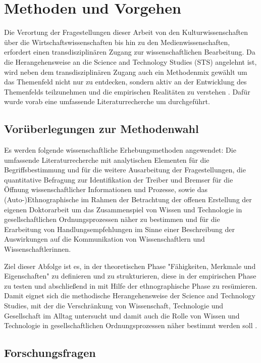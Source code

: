 \chapter{Methoden und Vorgehen}

Die Verortung der Fragestellungen dieser Arbeit von den Kulturwissenschaften über die Wirtschaftswissenschaften bis hin zu den Medienwissenschaften, erfordert einen transdisziplinären Zugang zur wissenschaftlichen Bearbeitung. Da die Herangehensweise an die Science and Technology Studies (STS) angelehnt ist, wird neben dem transdisziplinären Zugang auch ein Methodenmix gewählt um das Themenfeld nicht nur zu entdecken, sondern aktiv an der Entwicklung des Themenfelds teilzunehmen \cite{MacKenzie_STS_1999} und die empirischen Realitäten zu verstehen \cite{kelty_2014_freedom}. Dafür wurde vorab eine umfassende Literaturrecherche um durchgeführt.

\section{Vorüberlegungen zur Methodenwahl}

Es werden folgende wissenschaftliche Erhebungsmethoden angewendet: Die umfassende Literaturrecherche mit analytischen Elementen für die Begriffsbestimmung und für die weitere Ausarbeitung der Fragestellungen, die quantitative Befragung zur Identifikation der Treiber und Bremser für die Öffnung wissenschaftlicher Informationen und Prozesse, sowie das (Auto-)Ethnographische im Rahmen der Betrachtung der offenen Erstellung der eigenen Doktorarbeit um das Zusammenspiel von Wissen und Technologie in gesellschaftlichen Ordnungsprozessen näher zu bestimmen und für die Erarbeitung von Handlungsempfehlungen im Sinne einer Beschreibung der Auswirkungen auf die Kommunikation von Wissenschaftlern und Wissenschaftlerinnen.

Ziel dieser Abfolge ist es, in der theoretischen Phase "Fähigkeiten, Merkmale und Eigenschaften" \cite{raab_2012_fragebogen} zu definieren und zu strukturieren, diese in der empirischen Phase zu testen und abschließend in mit Hilfe der ethnographische Phase zu resümieren. Damit eignet sich die methodische Herangehensweise der Science and Technology Studies, mit der die Verschränkung von Wissenschaft, Technologie und Gesellschaft im Alltag untersucht und damit auch die Rolle von Wissen und Technologie in gesellschaftlichen Ordnungsprozessen näher bestimmt werden soll \cite{beck_2014_science}.

\section{Forschungsfragen}


